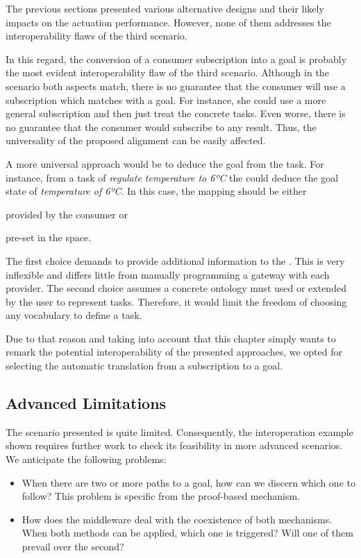 The previous sections presented various alternative designs and their likely impacts on the actuation performance.
However, none of them addresses the interoperability flaws of the third scenario.


In this regard, the conversion of a consumer subscription into a goal is probably the most evident interoperability flaw of the third scenario.
Although in the scenario both aspects match, there is no guarantee that the consumer will use a subscription which matches with a goal.
For instance, she could use a more general subscription and then just treat the concrete tasks.
Even worse, there is no guarantee that the consumer would subscribe to any result.
Thus, the universality of the proposed alignment can be easily affected.


A more universal approach would be to deduce the goal from the task. %
For instance, from a task of \emph{regulate temperature to 6ºC} the \Space{} could deduce the goal state of \emph{temperature of 6ºC}.
In this case, the mapping should be either
\begin{enumerate*}[label=\itshape(\arabic*\upshape)]
  \item provided by the consumer or
  \item pre-set in the space.
\end{enumerate*}
The first choice demands to provide additional information to the \Space{}. %
This is very inflexible and differs little from manually programming a gateway with each provider.
The second choice assumes a concrete ontology must used or extended by the user to represent tasks.
Therefore, it would limit the freedom of choosing any vocabulary to define a task.


Due to that reason and taking into account that this chapter simply wants to remark the potential interoperability of the presented approaches,
we opted for selecting the automatic translation from a subscription to a goal.



\subsection{Advanced Limitations}

The scenario presented is quite limited.
Consequently, the interoperation example shown requires further work to check its feasibility in more advanced scenarios.
We anticipate the following problems:

\begin{itemize}
  \item When there are two or more paths to a goal, how can we discern which one to follow?
	This problem is specific from the proof-based mechanism.
  \item How does the middleware deal with the coexistence of both mechanisms.
	When both methods can be applied, which one is triggered? Will one of them prevail over the second?
\end{itemize}